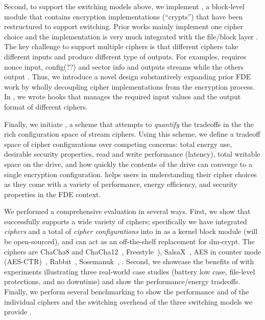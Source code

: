 Second, to support the switching models above, we implement \sysB, a block-level
module that contains encryption implementations (``crypts'') that have been
restructured to support switching. Prior works mainly implement one cipher
choice and the implementation is very much integrated with the file/block layer
\cite{StrongBox, any-other-works-like-this?}. The key challenge to support
multiple ciphers is that different ciphers take different inputs and produce
different type of outputs. For examples, \encA requires nonce input, \encB
config(??\xxx) and \encC sector info and \encC outputs streams while the others
output \xxx. Thus, we introduce a novel design substantively expanding prior FDE
work by wholly decoupling cipher implementations from the encryption process. In
\sysB, we wrote hooks that manages the required input values and the output
format of different ciphers.

Finally, we initiate \sysC, a scheme that attempts to {\em quantify} the
tradeoffs in the the rich configuration space of stream ciphers. Using this
scheme, we define a tradeoff space of cipher configurations over competing
concerns: total energy use, desirable security properties, read and write
performance (latency), total writable space on the drive, and how quickly the
contents of the drive can converge to a single encryption configuration. \sysC
helps users in understanding their cipher choices as they come with a variety of
performance, energy efficiency, and security properties in the FDE context.

We performed a comprehensive evaluation in several ways.
%
First, we show that \sys successfully supports a wide variety of ciphers;
specifically we have integrated {\em \numCiphers ciphers} and a total of {\em
\numConfigs cipher configurations} into \sys in \locTotal as a kernel block
module (will be open-sourced), and can act as an off-the-shelf replacement for
dm-crypt. The ciphers are ChaCha8 and ChaCha12~\cite{ChaCha20},
Freestyle~\cite{Freestyle}), SalsaX~\cite{SalsaX}, AES in counter mode
(AES-CTR)~\cite{AESCTR}, Rabbit~\cite{Rabbit}, Sosemanuk~\cite{Sosemanuk}, \xxx.
%
Second, we showcase the benefits of \sys with experiments illustrating three
real-world case studies (battery low case, file-level protections, and no
downtime) and show the performance/energy tradeoffs.
%
Finally, we perform several benchmarking to show the performance and \xxx of the
individual ciphers and the switching overhead of the three switching models we
provide .
